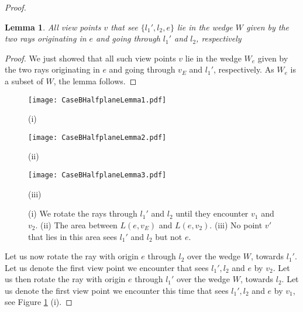 \documentclass[11pt]{article}
\newtheorem{lemma}{Lemma}
\begin{document}
\begin{proof}
\begin{lemma}\label{Case1aWedgeSummary} All view points $v$ that see $\{l_1',l_2,e\}$
lie in the wedge $W$ given by the two rays originating in $e$ and going through $l_1'$ and $l_2$, respectively
\end{lemma}

\begin{proof}
We just showed that all such view points $v$ lie in the wedge $W_e$ 
given by the two rays originating in $e$ and going through $v_E$ and $l_1'$, respectively. 
As $W_e$ is a subset of $W$, the lemma follows.
\end{proof}


\begin{figure}[hbtp]\begin{minipage}[t]{0.30\textwidth}
\begin{center}\texttt{[image: CaseBHalfplaneLemma1.pdf]}

(i)
\end{center}\end{minipage}
\hfill
\begin{minipage}[t]{0.20\textwidth}
\begin{center}\texttt{[image: CaseBHalfplaneLemma2.pdf]}

(ii)
\end{center}\end{minipage}
\hfill
\begin{minipage}[t]{0.28\textwidth}
\begin{center}\texttt{[image: CaseBHalfplaneLemma3.pdf]}

(iii)
\end{center}\end{minipage}
\caption{(i) We rotate the rays through $l_1'$ and $l_2$ until they encounter $v_1$ and $v_2$.  
(ii) The area between $L(e,v_E)$ and $L(e,v_2)$.
(iii) No point $v'$ that lies in this area sees $l_1'$ and $l_2$ but not $e$.}
\label{CaseBHalfplaneLemma-fig}
\end{figure}

Let us now rotate the ray with origin $e$ through $l_2$  over the wedge $W$, towards $l_1'$. Let us denote the first view point we encounter that sees $l_1', l_2$ and $e$  by $v_2$. Let us then rotate the ray with origin $e$ through $l_1'$  over the wedge $W$, towards $l_2$. Let us denote the first view point we encounter this time that sees $l_1', l_2$ and $e$  by $v_1$, 
see Figure \ref{CaseBHalfplaneLemma-fig} (i).
 

\end{proof}
\end{document}
